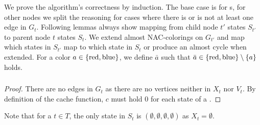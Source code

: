 We prove the algorithm's correctness by induction.
The base case is for \LeafNode{}s, for other nodes we split the reasoning for cases where
there is or is not at least one edge in \( G_t \).
%
Following lemmas always show mapping from child node \( t' \) states \( S_{t'} \)
to parent node \( t \) states \( S_t \).
We extend almost NAC-colorings on \( G_{t'} \) and
map which states in \( S_{t'} \) map to which state in \( S_t \)
or produce an almost cycle when extended.
%
For a color \( a \in \{\text{red}, \text{blue}\} \),
we define \( \bar{a} \) such that \( \bar{a} \in \{\text{red}, \text{blue}\} \setminus \{ a \} \) holds.

\subsubsection*{\LeafNode{}}

%
\begin{proof}
	There are no edges in \( G_t \) as there are no vertices
	neither in \( X_t \) nor \( V_t \).
	By definition of the cache function,
	\( c \) must hold \( 0 \) for each state of a \LeafNode{}.
\end{proof}
%
Note that for a \LeafNode{} \( t \in T \),
the only state in \( S_t \) is \( (\emptyset, \emptyset, \emptyset, \emptyset) \)
as \( X_t = \emptyset \).

\subsubsection*{\IntroduceVertexNode{}}

